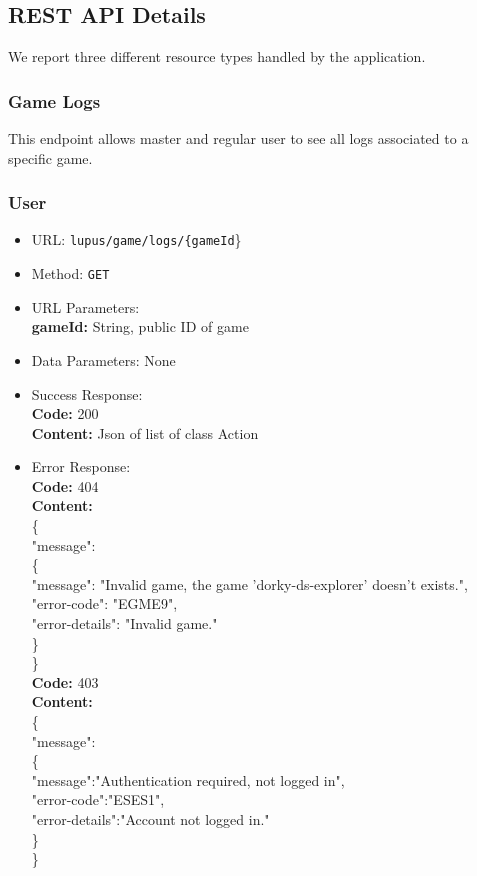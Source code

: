 \newcommand\tab[1][1cm]{\hspace*{#1}}

\subsection{REST API Details}
We report three different resource types handled by the application.

\subsubsection*{Game Logs}
This endpoint allows master and regular user to see all logs associated to a specific game.

\subsubsection*{User}
\begin{itemize}
    \item URL: \texttt{lupus/game/logs/\{gameId}\}
    \item Method: \texttt{GET}
    \item URL Parameters:\\
        \textbf{gameId:} String, public ID of game
    \item Data Parameters: None
    \item Success Response: \\
        \textbf{Code:} 200\\
        \textbf{Content:} Json of list of class Action
    \item Error Response:\\
        \textbf{Code:} 404\\
        \textbf{Content:}\\
        \{\\
        \tab "message": \\
        \tab \{\\
        \tab \tab "message": "Invalid game, the game 'dorky-ds-explorer' doesn't exists.",\\
        \tab \tab "error-code": "EGME9",\\
        \tab \tab "error-details": "Invalid game."\\
         \tab \}\\
        \}\\
        \textbf{Code:} 403\\
        \textbf{Content:}\\
        \{\\
         \tab "message":\\
         \tab \{\\
         \tab \tab "message":"Authentication required, not logged in",\\
         \tab \tab "error-code":"ESES1",\\
         \tab \tab "error-details":"Account not logged in."\\
         \tab \}\\
        \}\\
\end{itemize}
